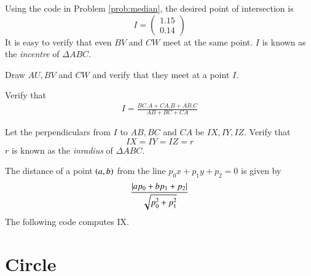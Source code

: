 \documentclass[journal,12pt,twocolumn]{IEEEtran}
\begin{document}
\solution Using the code in Problem \ref{prob:median}, the desired point of intersection is
\begin{equation}
I = 
\begin{pmatrix}
1.15
\\
0.14
\end{pmatrix}
\end{equation}
%
It is easy to verify that even $BV$ and $CW$ meet at the same point.  $I$ is known as
the {\em incentre} of $\Delta ABC$. 
\begin{problem}
Draw $AU, BV$ and $CW$ and verify that they meet at a point $I$.  
\end{problem}
%
%
\begin{problem}
Verify that
\begin{align}
I = \frac{BC.A + CA.B + AB.C}{AB+BC+CA}
\end{align}
%
\end{problem}
\begin{problem}
\label{prob:incircle_normal}
Let the perpendiculars from $I$ to $AB, BC$ and $CA$ be $IX, IY, IZ$.  Verify that
\begin{equation}
IX = IY = IZ = r
\end{equation}
$r$ is known as the {\em inradius} of $\Delta ABC$.
\end{problem}
\solution
The distance of a point $\left(a,b\right)$ from the line $p_0x+p_1y+p_2=0$ is given by 
\begin{equation}
\frac{\left\vert ap_0+bp_1+p_2\right\vert}{\sqrt{p_0^2+p_1^2}}
\end{equation}
The following code computes IX.

\section{Circle}
\end{document}
